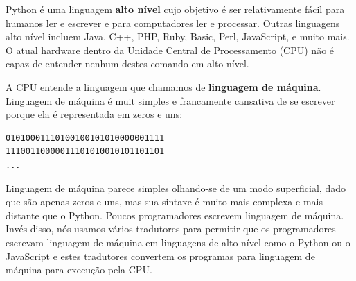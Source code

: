 Python é uma linguagem {\bf alto nível} cujo objetivo é ser
relativamente fácil para humanos ler e escrever e para computadores
ler e processar. Outras linguagens alto nível incluem Java, C++,
PHP, Ruby, Basic, Perl, JavaScript, e muito mais. O atual hardware
dentro da Unidade Central de Processamento (CPU) não é capaz de entender
nenhum destes comando em alto nível.
%

A CPU entende a linguagem que chamamos de {\bf linguagem de máquina}. Linguagem
de máquina é muit simples e francamente cansativa de se escrever porque ela é
representada em zeros e uns:
%

\beforeverb
\begin{verbatim}
01010001110100100101010000001111
11100110000011101010010101101101
...
\end{verbatim}
\afterverb

Linguagem de máquina parece simples olhando-se de um modo superficial, 
dado que são apenas zeros e uns, mas sua sintaxe é muito mais complexa
e mais distante que o Python. Poucos programadores escrevem linguagem de
máquina. Invés disso, nós usamos vários tradutores para permitir que os 
programadores escrevam linguagem de máquina em linguagens de alto nível 
como o Python ou o JavaScript e estes tradutores convertem os programas
para linguagem de máquina para execução pela CPU. 
%

